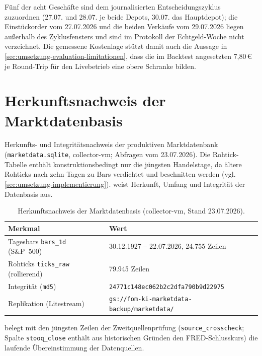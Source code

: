 Fünf der acht Geschäfte sind dem journalisierten Entscheidungszyklus zuzuordnen
(27.07. und 28.07. je beide Depots, 30.07. das Hauptdepot); die Einstückorder vom
27.07.2026 und die beiden Verkäufe vom 29.07.2026 liegen außerhalb des
Zyklusfensters und sind im Protokoll der Echtgeld-Woche nicht verzeichnet. Die
gemessene Kostenlage stützt damit auch die Aussage in
\cref{sec:umsetzung-evaluation-limitationen}, dass die im Backtest angesetzten
7{,}80\,€ je Round-Trip für den Livebetrieb eine obere Schranke bilden.

\section{Herkunftsnachweis der Marktdatenbasis}
\label{sec:anhang-provenienz}

Herkunfts- und Integritätsnachweis der produktiven Marktdatenbank
(\texttt{marketdata.sqlite}, collector-vm; Abfragen vom 23.07.2026). Die
Rohtick-Tabelle enthält konstruktionsbedingt nur die jüngsten Handelstage, da
ältere Rohticks nach zehn Tagen zu Bars verdichtet und beschnitten werden
(vgl. \cref{sec:umsetzung-implementierung}).  weist
Herkunft, Umfang und Integrität der Datenbasis aus.

\begin{table}[htbp]
  \centering
  \caption[Herkunftsnachweis der Marktdatenbasis]{Herkunftsnachweis der
    Marktdatenbasis (collector-vm, Stand 23.07.2026).\quelleeigen}
  \label{tab:anhang-provenienz}
  \begin{tabular}{l l}
    \hline
    Merkmal & Wert \\
    \hline
    Tagesbars \texttt{bars\_1d} (S\&P~500) & 30.12.1927 -- 22.07.2026, 24.755 Zeilen \\
    Rohticks \texttt{ticks\_raw} (rollierend) & 79.945 Zeilen \\
    Integrität (\texttt{md5}) & \texttt{24771c148ec062b2c2dfa790b9d22975} \\
    Replikation (Litestream) & \texttt{gs://fom-ki-marketdata-backup/marketdata/} \\
    \hline
  \end{tabular}
\end{table}

 belegt mit den jüngsten Zeilen der
Zweitquellenprüfung (\texttt{source\_crosscheck}; Spalte \texttt{stooq\_close}
enthält aus historischen Gründen den FRED-Schlusskurs) die laufende
Übereinstimmung der Datenquellen.

